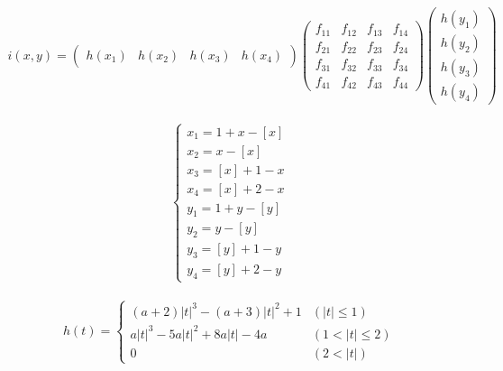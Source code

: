       \begin{eqnarray}
        \label{バイキュービック法1}
        i(x,y) = 
        \begin{pmatrix}
        h(x_{1}) & h(x_{2}) & h(x_{3}) & h(x_{4})
        \end{pmatrix}
        \begin{pmatrix}
          f_{11} & f_{12} & f_{13} & f_{14} \\
          f_{21} & f_{22} & f_{23} & f_{24} \\
          f_{31} & f_{32} & f_{33} & f_{34} \\
          f_{41} & f_{42} & f_{43} & f_{44}
        \end{pmatrix}
        \begin{pmatrix}
          h(y_{1}) \\ h(y_{2}) \\ h(y_{3}) \\ h(y_{4})
        \end{pmatrix}
      \end{eqnarray}
  
      \begin{eqnarray}
        \label{バイキュービック法2}
        \left\{
          \begin{array}{l}
            x_{1} = 1 + x - [x] \\
            x_{2} = x - [x]     \\
            x_{3} = [x] + 1 - x \\
            x_{4} = [x] + 2 - x \\
            y_{1} = 1 + y - [y] \\
            y_{2} = y - [y]     \\
            y_{3} = [y] + 1 - y \\
            y_{4} = [y] + 2 - y
          \end{array}
        \right.
      \end{eqnarray}

      \begin{eqnarray}
        \label{バイキュービック法3}
        h(t) = 
        \left\{
          \begin{array}{ll}
            (a + 2) |t|^3 - (a + 3)|t|^2 + 1 & (|t| \leq 1)   \\
            a|t|^3 - 5a|t|^2 + 8a|t| - 4a    & (1 < |t| \leq 2) \\
            0                                & (2 < |t|)
          \end{array}
        \right.
      \end{eqnarray}

